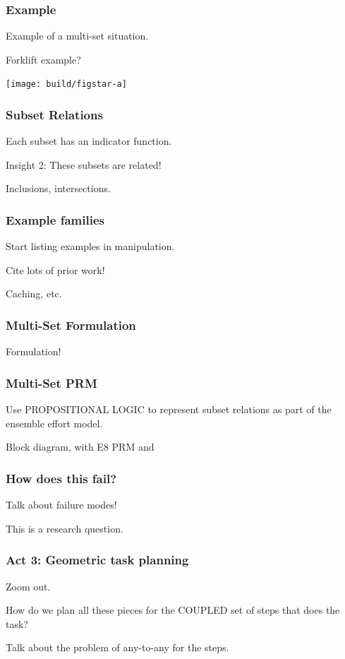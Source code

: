 \documentclass[serif]{beamer}
\begin{document}
\begin{frame}
   \frametitle{Example}
   
   Example of a multi-set situation.
   
   Forklift example?
   
   \texttt{[image: build/figstar-a]}
   
\end{frame}

\begin{frame}
   \frametitle{Subset Relations}
   
   Each subset has an indicator function.
   
   Insight 2:
   These subsets are related!
   
   Inclusions, intersections.
\end{frame}

\begin{frame}
   \frametitle{Example families}
   
   Start listing examples in manipulation.
   
   Cite lots of prior work!
   
   Caching, etc.

\end{frame}

\begin{frame}
   \frametitle{Multi-Set Formulation}
   
   Formulation!
\end{frame}

\begin{frame}
   \frametitle{Multi-Set PRM}
   
   Use PROPOSITIONAL LOGIC to represent subset relations
   as part of the ensemble effort model.
   
   Block diagram, with E8 PRM and 
\end{frame}

\begin{frame}
   \frametitle{How does this fail?}
   
   Talk about failure modes!
   
   This is a research question.
\end{frame}

\begin{frame}
   \frametitle{Act 3: Geometric task planning}
   
   Zoom out.
   
   How do we plan all these pieces for the COUPLED set of steps
   that does the task?
   
   Talk about the problem of any-to-any for the steps.
   
\end{frame}
\end{document}
